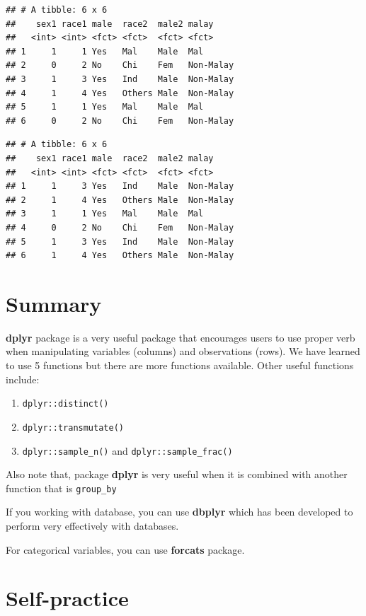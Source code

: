 \documentclass[
]{book}
\providecommand{\tightlist}{%
  \setlength{\itemsep}{0pt}\setlength{\parskip}{0pt}}
\begin{document}
\begin{verbatim}
## # A tibble: 6 x 6
##    sex1 race1 male  race2  male2 malay    
##   <int> <int> <fct> <fct>  <fct> <fct>    
## 1     1     1 Yes   Mal    Male  Mal      
## 2     0     2 No    Chi    Fem   Non-Malay
## 3     1     3 Yes   Ind    Male  Non-Malay
## 4     1     4 Yes   Others Male  Non-Malay
## 5     1     1 Yes   Mal    Male  Mal      
## 6     0     2 No    Chi    Fem   Non-Malay
\end{verbatim}

\begin{verbatim}
## # A tibble: 6 x 6
##    sex1 race1 male  race2  male2 malay    
##   <int> <int> <fct> <fct>  <fct> <fct>    
## 1     1     3 Yes   Ind    Male  Non-Malay
## 2     1     4 Yes   Others Male  Non-Malay
## 3     1     1 Yes   Mal    Male  Mal      
## 4     0     2 No    Chi    Fem   Non-Malay
## 5     1     3 Yes   Ind    Male  Non-Malay
## 6     1     4 Yes   Others Male  Non-Malay
\end{verbatim}

\hypertarget{summary}{%
\section{Summary}\label{summary}}

\textbf{dplyr} package is a very useful package that encourages users to use proper verb when manipulating variables (columns) and observations (rows). We have learned to use 5 functions but there are more functions available. Other useful functions include:

\begin{enumerate}
\def\labelenumi{\arabic{enumi}.}
\tightlist
\item
  \texttt{dplyr::distinct()}
\item
  \texttt{dplyr::transmutate()}
\item
  \texttt{dplyr::sample\_n()} and \texttt{dplyr::sample\_frac()}
\end{enumerate}

Also note that, package \textbf{dplyr} is very useful when it is combined with another function that is \texttt{group\_by}

If you working with database, you can use \textbf{dbplyr} which has been developed to perform very effectively with databases.

For categorical variables, you can use \textbf{forcats} package.

\hypertarget{self-practice}{%
\section{Self-practice}\label{self-practice}}
\end{document}
